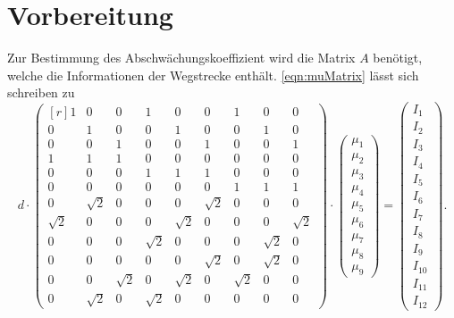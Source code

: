 \section{Vorbereitung}
\label{sec:Vorbereitung}
Zur Bestimmung des Abschwächungskoeffizient wird die Matrix $A$ benötigt, welche die Informationen der Wegstrecke enthält. \autoref{eqn:muMatrix} lässt sich schreiben zu
\begin{equation}
    d \cdot
    \begin{pmatrix}[r]
        1 & 0 & 0 & 1 & 0 & 0 & 1 & 0 & 0 \\
        0 & 1 & 0 & 0 & 1 & 0 & 0 & 1 & 0 \\
        0 & 0 & 1 & 0 & 0 & 1 & 0 & 0 & 1 \\
        1 & 1 & 1 & 0 & 0 & 0 & 0 & 0 & 0 \\
        0 & 0 & 0 & 1 & 1 & 1 & 0 & 0 & 0 \\
        0 & 0 & 0 & 0 & 0 & 0 & 1 & 1 & 1 \\
        0 & \sqrt{2} & 0 & 0 & 0 & \sqrt{2} & 0 & 0 & 0 \\
        \sqrt{2} & 0 & 0 & 0 & \sqrt{2} & 0 & 0 & 0 & \sqrt{2} \\
        0 & 0 & 0 & \sqrt{2} & 0 & 0 & 0 & \sqrt{2} & 0 \\
        0 & 0 & 0 & 0 & 0 & \sqrt{2} & 0 & \sqrt{2} & 0 \\
        0 & 0 & \sqrt{2} & 0 & \sqrt{2} & 0 & \sqrt{2} & 0 & 0 \\
        0 & \sqrt{2} & 0 & \sqrt{2} & 0 & 0 & 0 & 0 & 0 
    \end{pmatrix}
    \cdot
    \begin{pmatrix}
        \mu_1 \\
        \mu_2 \\
        \mu_3 \\
        \mu_4 \\
        \mu_5 \\
        \mu_6 \\
        \mu_7 \\
        \mu_8 \\
        \mu_9 
    \end{pmatrix}
    =
    \begin{pmatrix}
        I_1 \\
        I_2 \\
        I_3 \\
        I_4 \\
        I_5 \\
        I_6 \\
        I_7 \\
        I_8 \\
        I_9 \\
        I_{10} \\
        I_{11} \\
        I_{12} 
    \end{pmatrix}
    .
\end{equation}